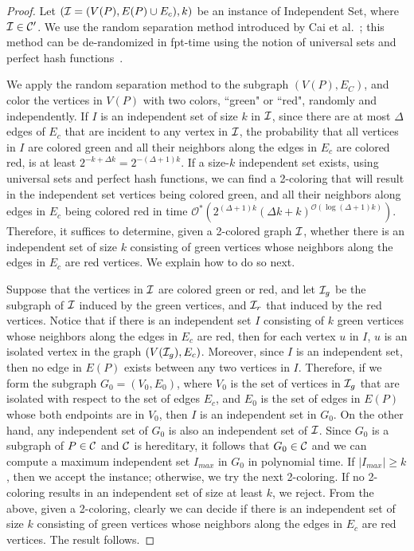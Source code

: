 \documentclass[11pt]{article}
\newcommand{\Oh}{{\mathcal O}}
\newcommand{\Ohstar}{{\mathcal O^{*}}}
\begin{document}
\begin{proof}
Let $({\cal I} = (V(P), E(P) \cup E_c), k)$ be an instance of {\sc Independent Set}, where ${\cal I} \in {\cal C'}$.
We use the random separation method introduced by Cai et al.~\cite{cai}; this method can be de-randomized in fpt-time using the notion of universal sets and perfect hash functions~\cite{alon95,naor,schmidt}.

We apply the random separation method to the subgraph $(V(P), E_C)$, and color the vertices in $V(P)$ with two colors, ``green" or ``red", randomly and independently. If $I$ is an independent set of size $k$ in ${\cal I}$, since there are at most $\Delta$ edges of $E_c$ that are incident to any vertex in ${\cal I}$, the probability that all vertices in $I$ are colored green and all their neighbors along the edges in $E_c$ are colored red, is at least $2^{-k + \Delta k} = 2^{-(\Delta+1)k}$. If a size-$k$ independent set exists, using universal sets and perfect hash functions, we can find a 2-coloring that will result in the independent set vertices being colored green, and all their neighbors along edges in $E_c$ being colored red in time $\Ohstar(2^{(\Delta + 1)k}(\Delta k + k)^{\Oh(\log(\Delta + 1)k)})$. Therefore, it suffices to determine, given a 2-colored graph ${\cal I}$, whether there is an independent set of size $k$ consisting of green vertices whose neighbors along the edges in $E_c$ are red vertices. We explain how to do so next.


Suppose that the vertices in ${\cal I}$ are colored green or red, and let ${\cal I}_g$ be the subgraph of ${\cal I}$ induced by the green vertices, and ${\cal I}_r$ that induced by the red vertices. Notice that if there is an independent set $I$ consisting of $k$ green vertices whose neighbors along the edges in $E_c$ are red, then for each vertex $u$ in $I$, $u$ is an isolated vertex in the graph $(V({\cal I}_g), E_c)$. Moreover, since $I$ is an independent set, then no edge in $E(P)$ exists between any two vertices in $I$. Therefore, if we form the subgraph $G_0 = (V_0, E_0)$, where $V_0$ is the set of vertices in ${\cal I}_g$ that are isolated with respect to the set of edges $E_c$, and $E_0$ is the set of edges in $E(P)$ whose both endpoints are in $V_0$, then $I$ is an independent set in $G_0$. On the other hand, any independent set of $G_0$ is also an independent set of ${\cal I}$.  Since $G_0$ is a subgraph of $P \in {\cal C}$ and ${\cal C}$ is hereditary, it follows that $G_0 \in {\cal C}$ and we can compute a maximum independent set $I_{max}$ in $G_0$ in polynomial time. If $|I_{max}| \geq k$, then we accept the instance; otherwise, we try the next 2-coloring. If no 2-coloring results in an independent set of size at least $k$, we reject. From the above, given a 2-coloring, clearly we can decide if there is an independent set of size $k$ consisting of green vertices whose neighbors along the edges in $E_c$ are red vertices. The result follows.\end{proof}
\end{document}

